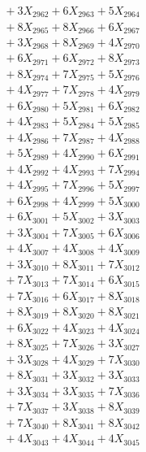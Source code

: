 \documentclass[a4paper,10pt]{article}
\begin{document}
{\begin{align}
&\;  + 3 X_{2962} + 6 X_{2963} + 5 X_{2964} \\[0.3ex]
&\;  + 8 X_{2965} + 8 X_{2966} + 6 X_{2967} \\[0.3ex]
&\;  + 3 X_{2968} + 8 X_{2969} + 4 X_{2970} \\[0.3ex]
&\;  + 6 X_{2971} + 6 X_{2972} + 8 X_{2973} \\[0.3ex]
&\;  + 8 X_{2974} + 7 X_{2975} + 5 X_{2976} \\[0.3ex]
&\;  + 4 X_{2977} + 7 X_{2978} + 4 X_{2979} \\[0.5ex]\allowbreak
&\;  + 6 X_{2980} + 5 X_{2981} + 6 X_{2982} \\[0.3ex]
&\;  + 4 X_{2983} + 5 X_{2984} + 5 X_{2985} \\[0.3ex]
&\;  + 4 X_{2986} + 7 X_{2987} + 4 X_{2988} \\[0.3ex]
&\;  + 5 X_{2989} + 4 X_{2990} + 6 X_{2991} \\[0.3ex]
&\;  + 4 X_{2992} + 4 X_{2993} + 7 X_{2994} \\[0.3ex]
&\;  + 4 X_{2995} + 7 X_{2996} + 5 X_{2997} \\[0.3ex]
&\;  + 6 X_{2998} + 4 X_{2999} + 5 X_{3000} \\[0.3ex]
&\;  + 6 X_{3001} + 5 X_{3002} + 3 X_{3003} \\[0.3ex]
&\;  + 3 X_{3004} + 7 X_{3005} + 6 X_{3006} \\[0.3ex]
&\;  + 4 X_{3007} + 4 X_{3008} + 4 X_{3009} \\[0.5ex]\allowbreak
&\;  + 3 X_{3010} + 8 X_{3011} + 7 X_{3012} \\[0.3ex]
&\;  + 7 X_{3013} + 7 X_{3014} + 6 X_{3015} \\[0.3ex]
&\;  + 7 X_{3016} + 6 X_{3017} + 8 X_{3018} \\[0.3ex]
&\;  + 8 X_{3019} + 8 X_{3020} + 8 X_{3021} \\[0.3ex]
&\;  + 6 X_{3022} + 4 X_{3023} + 4 X_{3024} \\[0.3ex]
&\;  + 8 X_{3025} + 7 X_{3026} + 3 X_{3027} \\[0.3ex]
&\;  + 3 X_{3028} + 4 X_{3029} + 7 X_{3030} \\[0.3ex]
&\;  + 8 X_{3031} + 3 X_{3032} + 3 X_{3033} \\[0.3ex]
&\;  + 3 X_{3034} + 3 X_{3035} + 7 X_{3036} \\[0.3ex]
&\;  + 7 X_{3037} + 3 X_{3038} + 8 X_{3039} \\[0.5ex]\allowbreak
&\;  + 7 X_{3040} + 8 X_{3041} + 8 X_{3042} \\[0.3ex]
&\;  + 4 X_{3043} + 4 X_{3044} + 4 X_{3045} \\[0.3ex]

\end{align}}
\end{document}
